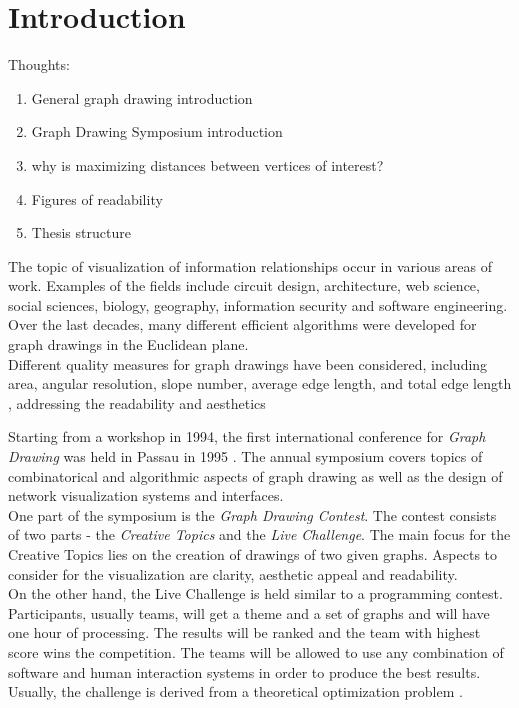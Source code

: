 \section{Introduction}

Thoughts:
\begin{enumerate}
	\item General graph drawing introduction
	\item Graph Drawing Symposium introduction
	\item why is maximizing distances between vertices of interest?
	\item Figures of readability
	\item Thesis structure
\end{enumerate}



The topic of visualization of information relationships occur in various areas of work. Examples of the fields include circuit design, architecture, web science, social sciences, biology, geography, information security and software engineering. Over the last decades, many different efficient algorithms were developed for graph drawings in the Euclidean plane.\\
Different quality measures for graph drawings have been considered, including area, angular resolution, slope number, average edge length, and total edge length \cite{edge-length-ratio-2tree}, addressing the readability and aesthetics 
\bigskip


Starting from a workshop in 1994, the first international conference for \emph{Graph Drawing} was held in Passau in 1995 \cite{GD:Symposium}. The annual symposium covers topics of combinatorical and algorithmic aspects of graph drawing as well as the design of network visualization systems and interfaces.\\
One part of the symposium is the \emph{Graph Drawing Contest}. The contest consists of two parts - the \emph{Creative Topics} and the \emph{Live Challenge}. The main focus for the Creative Topics lies on the creation of drawings of two given graphs. Aspects to consider for the visualization are clarity, aesthetic appeal and readability.\\
On the other hand, the Live Challenge is held similar to a programming contest. Participants, usually teams, will get a theme and a set of graphs and will have one hour of processing. The results will be ranked and the team with highest score wins the competition. The teams will be allowed to use any combination of software and human interaction systems in order to produce the best results. Usually, the challenge is derived from a theoretical optimization problem \cite{GD:2021}.

